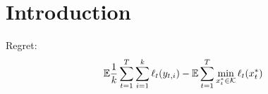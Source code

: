 \section{Introduction}\label{sec:intro}
\begin{defn}
	Regret:
	$$\mathbb{E} \frac{1}{k} \sum_{t=1}^T \sum_{i=1}^k \ell_t(y_{t,i}) - \mathbb{E} \sum_{t=1}^T \min_{x^*_t\in \mathcal{K}}\ell_t(x^*_t)$$
\end{defn}



